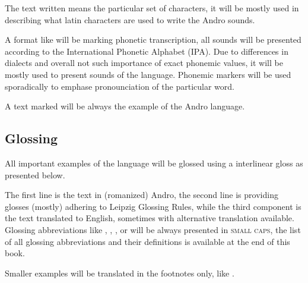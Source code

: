The text written  means the particular set of characters, it will
be mostly used in describing what latin characters are used to write the Andro
sounds.

A format like  will be marking phonetic transcription, all
sounds will be presented according to the International Phonetic Alphabet (IPA).
Due to differences in dialects and overall not such importance of exact phonemic
values, it will be mostly used to present sounds of the language. Phonemic
markers  will be used sporadically to emphase pronounciation of
the particular word.

A text marked  will be always the example of the Andro
language.

\subsection{Glossing}

All important examples of the language will be glossed using a interlinear gloss
as presented below.


The first line is the text in (romanized) Andro, the second line is providing
glosses (mostly) adhering to Leipzig Glossing Rules, while the third component
is the text translated to English, sometimes with alternative translation
available. Glossing abbreviations like \Dem{}, \Inan{}, \Rel{}, \Refl{} or
\Top{} will be always presented in \textsc{small caps}, the list of all glossing
abbreviations and their definitions is available at the end of this book.

Smaller examples will be translated in the footnotes only, like
.